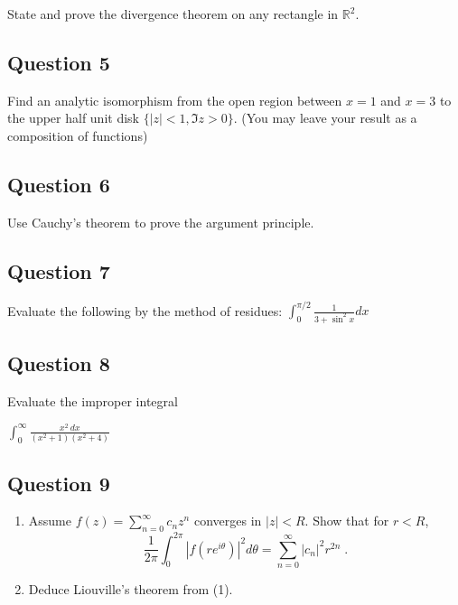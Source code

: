 \documentclass[12pt]{article}
\begin{document}
State and prove the divergence theorem on any rectangle in
\(\mathbb{R}^2\).

\hypertarget{question-5-2}{%
\subsection{Question 5}\label{question-5-2}}

Find an analytic isomorphism from the open region between \(x = 1\) and
\(x = 3\) to the upper half unit disk \(\{|z| < 1,\Im z > 0\}\). (You
may leave your result as a composition of functions)

\hypertarget{question-6-2}{%
\subsection{Question 6}\label{question-6-2}}

Use Cauchy's theorem to prove the argument principle.

\hypertarget{question-7-2}{%
\subsection{Question 7}\label{question-7-2}}

Evaluate the following by the method of residues:
\(\int_0^{\pi /2} \frac{1}{3+\sin^2x}dx\)

\hypertarget{question-8-2}{%
\subsection{Question 8}\label{question-8-2}}

Evaluate the improper integral

\(\int_0^\infty \frac{x^2~dx}{(x^2+1)(x^2+4)}\)

\hypertarget{question-9-2}{%
\subsection{Question 9}\label{question-9-2}}

\begin{enumerate}
\def\labelenumi{(\arabic{enumi})}
\item
  Assume \(\displaystyle f(z) = \sum_{n=0}^\infty c_n z^n\) converges in
  \(|z| < R\). Show that for \(r <R\),
  \[\frac{1}{2 \pi} \int_0^{2 \pi} |f(r e^{i \theta})|^2 d \theta =
  \sum_{n=0}^\infty |c_n|^2 r^{2n} \; .\]
\item
  Deduce Liouville's theorem from (1).
\end{enumerate}
\end{document}
